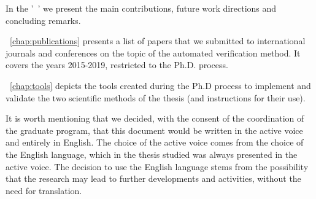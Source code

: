In the '~' we present the main contributions, future work directions and concluding remarks.

~\autoref{chap:publications} presents a list of papers that we submitted to international journals and conferences on the topic of the automated verification method. It covers the years 2015-2019, restricted to the Ph.D. process.

~\autoref{chap:tools} depicts the tools created during the Ph.D process to implement and validate the two scientific methods of the thesis (and instructions for their use).

It is worth mentioning that we decided, with the consent of the coordination of the graduate program, that this document would be written in the active voice and entirely in English. The choice of the active voice comes from the choice of the English language, which in the thesis studied was always presented in the active voice. The decision to use the English language stems from the possibility that the research may lead to further developments and activities, without the need for translation.